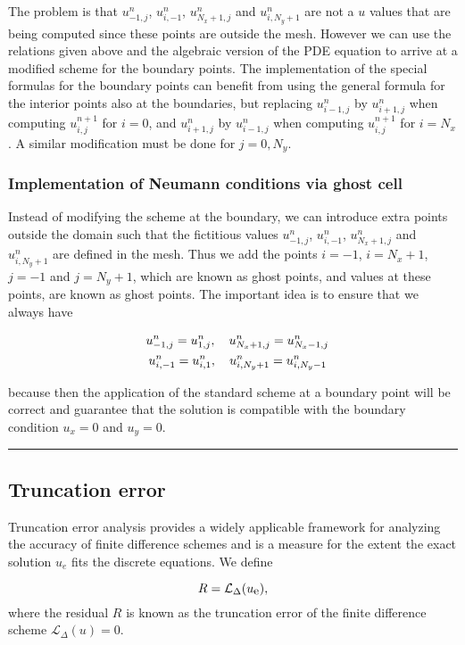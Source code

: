 \documentclass[letterpaper,10pt,english]{/usr/share/sphinx/texinputs/sphinxhowto}
\begin{document}
The problem is that $u^n_{-1,j}$, $u^n_{i,-1}$, $u^n_{N_x+1,j}$ and
$u^n_{i,N_y+1}$ are not a $u$ values that are being computed since these
points are outside the mesh. However we can use the relations given
above and the algebraic version of the PDE equation to arrive at a
modified scheme for the boundary points. The implementation of the
special formulas for the boundary points can benefit from using the
general formula for the interior points also at the boundaries, but
replacing $u_{i-1,j}^n$ by $u_{i+1,j}^n$ when computing $u_{i,j}^{n+1}$
for $i=0$, and $u_{i+1,j}^n$ by $u_{i-1,j}^n$ when computing
$u_{i,j}^{n+1}$ for $i=N_x$. A similar modification must be done for
$j=0,N_y$.\subsubsection{Implementation of Neumann conditions via ghost cell}

Instead of modifying the scheme at the boundary, we can introduce extra
points outside the domain such that the fictitious values $u^n_{-1,j}$,
$u^n_{i,-1}$, $u^n_{N_x+1,j}$ and $u^n_{i,N_y+1}$ are defined in the
mesh. Thus we add the points $i=-1$, $i=N_x+1$, $j=-1$ and $j=N_y+1$,
which are known as ghost points, and values at these points, are known
as ghost points. The important idea is to ensure that we always have

\begin{align*}
 u^n_{-1,j}=u^n_{1,j}, \quad u^n_{N_x+1,j}=u^n_{N_x-1,j} \\
\quad u^n_{i,-1}=u^n_{i,1}, \quad u^n_{i,N_y+1}=u^n_{i,N_y-1}
\thinspace 
\end{align*}

because then the application of the standard scheme at a boundary point
will be correct and guarantee that the solution is compatible with the
boundary condition $u_x=0$ and $u_y=0$.\begin{center}\rule{3in}{0.4pt}\end{center}

\subsection{Truncation error}

Truncation error analysis provides a widely applicable framework for
analyzing the accuracy of finite difference schemes and is a measure for
the extent the exact solution $u_e$ fits the discrete equations. We
define

\[
R = \mathcal{L}_\Delta({u_{\small\mbox{e}}}),
\] where the residual $R$ is known as the truncation error of the finite
difference scheme $\mathcal{L}_\Delta(u) = 0$.
\end{document}
